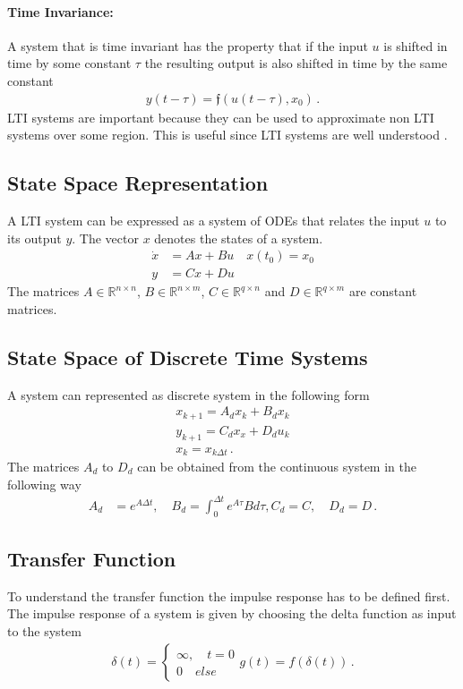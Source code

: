 \paragraph{Time Invariance:}
A system that is time invariant has the property that if the input \(u\) is shifted in time by some constant \(\tau\) the resulting output is also shifted in time by the same constant
\begin{gather}
y(t - \tau) = \mathfrak{f}(u(t-\tau),  x_0) \,.
\end{gather}
LTI systems are important because they can be used to approximate non LTI systems over some region.
This is useful since LTI systems are well understood \cite{DouglasB}.
\subsection{State Space Representation}
A LTI system can be expressed as a system of ODEs that relates the input \(u\) to its output \(y\).
The vector \(x\) denotes the states of a system.
\begin{align}
\dot{x} &= Ax + Bu \quad x(t_0) = x_0\\
y &= Cx + Du
\end{align}
The matrices \(A \in \mathbb{R}^{n \times n}\),
\(B \in \mathbb{R}^{n \times m}\),
\(C \in \mathbb{R}^{q \times n}\) and
\(D \in \mathbb{R}^{q \times m}\) are constant matrices.
\cite{BennerGrivet}
\subsection{State Space of Discrete Time Systems}
A system can represented as discrete system in the following form
\begin{gather}
x_{k+1} = A_dx_k + B_dx_k \label{disc-a} \\
y_{k+1} = C_dx_x + D_du_k \label{disc-b}\\
x_{k} = x_{k\Delta t} \,.
\end{gather}
The matrices \(A_d\) to \(D_d\) can be obtained from the continuous system in the following way \cite{brunton_kutz_2019g}
\begin{align}
A_d &= e^{A\Delta t}, \quad B_d = \int_0^{\Delta t} e^{A\tau}B d\tau, 
C_d = C, \quad D_d = D \,.
\end{align}
\subsection{Transfer Function}
To understand the transfer function the impulse response has to be defined first.
The impulse response of a system is given by choosing the delta function as input to the system
\begin{gather}
\delta(t) = \begin{cases}
\infty, \quad t = 0 \\
0 \quad else
\end{cases}
g(t) = f(\delta(t)) \,.
\end{gather}

